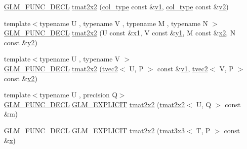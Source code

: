 \begin{DoxyCompactItemize}
\mbox{\hyperlink{setup_8hpp_ab2d052de21a70539923e9bcbf6e83a51}{G\+L\+M\+\_\+\+F\+U\+N\+C\+\_\+\+D\+E\+CL}} \mbox{\hyperlink{structglm_1_1tmat2x2_a6b69a58d1a8d7856f47240557f0c8615}{tmat2x2}} (\mbox{\hyperlink{structglm_1_1tmat2x2_a9e4690f52926b475b36ed5f6209f22f4}{col\+\_\+type}} const \&\mbox{\hyperlink{glad_8h_a0779c3b73f9aa3a0ac5b0139b5d291d9}{v1}}, \mbox{\hyperlink{structglm_1_1tmat2x2_a9e4690f52926b475b36ed5f6209f22f4}{col\+\_\+type}} const \&\mbox{\hyperlink{glad_8h_a9a09a1837922b2b806f4589096a52049}{v2}})
\item 
{\footnotesize template$<$typename U , typename V , typename M , typename N $>$ }\\\mbox{\hyperlink{setup_8hpp_ab2d052de21a70539923e9bcbf6e83a51}{G\+L\+M\+\_\+\+F\+U\+N\+C\+\_\+\+D\+E\+CL}} \mbox{\hyperlink{structglm_1_1tmat2x2_aac710faffcebf55cc2120a98b4ab0373}{tmat2x2}} (U const \&x1, V const \&\mbox{\hyperlink{glad_8h_a48340161068d267815ac3131e9d03def}{y1}}, M const \&\mbox{\hyperlink{glad_8h_ad2cea6eadb01f017f0d57e7edf0ce988}{x2}}, N const \&\mbox{\hyperlink{glad_8h_af7158b5d27f7a6aa4ab9973fcc3a5c20}{y2}})
\item 
{\footnotesize template$<$typename U , typename V $>$ }\\\mbox{\hyperlink{setup_8hpp_ab2d052de21a70539923e9bcbf6e83a51}{G\+L\+M\+\_\+\+F\+U\+N\+C\+\_\+\+D\+E\+CL}} \mbox{\hyperlink{structglm_1_1tmat2x2_ab910eb77d8f50dfa02ad062bb429e0a5}{tmat2x2}} (\mbox{\hyperlink{structglm_1_1tvec2}{tvec2}}$<$ U, P $>$ const \&\mbox{\hyperlink{glad_8h_a0779c3b73f9aa3a0ac5b0139b5d291d9}{v1}}, \mbox{\hyperlink{structglm_1_1tvec2}{tvec2}}$<$ V, P $>$ const \&\mbox{\hyperlink{glad_8h_a9a09a1837922b2b806f4589096a52049}{v2}})
\item 
{\footnotesize template$<$typename U , precision Q$>$ }\\\mbox{\hyperlink{setup_8hpp_ab2d052de21a70539923e9bcbf6e83a51}{G\+L\+M\+\_\+\+F\+U\+N\+C\+\_\+\+D\+E\+CL}} \mbox{\hyperlink{setup_8hpp_a6c74f5a5e7b134ab69023ff9a30d4d5d}{G\+L\+M\+\_\+\+E\+X\+P\+L\+I\+C\+IT}} \mbox{\hyperlink{structglm_1_1tmat2x2_add527359c118148fb8984d4868e0dc7f}{tmat2x2}} (\mbox{\hyperlink{structglm_1_1tmat2x2}{tmat2x2}}$<$ U, Q $>$ const \&m)
\item 
\mbox{\hyperlink{setup_8hpp_ab2d052de21a70539923e9bcbf6e83a51}{G\+L\+M\+\_\+\+F\+U\+N\+C\+\_\+\+D\+E\+CL}} \mbox{\hyperlink{setup_8hpp_a6c74f5a5e7b134ab69023ff9a30d4d5d}{G\+L\+M\+\_\+\+E\+X\+P\+L\+I\+C\+IT}} \mbox{\hyperlink{structglm_1_1tmat2x2_a21e814f61b4c8769f9e7ac36e531fc3a}{tmat2x2}} (\mbox{\hyperlink{structglm_1_1tmat3x3}{tmat3x3}}$<$ T, P $>$ const \&\mbox{\hyperlink{glad_8h_a92d0386e5c19fb81ea88c9f99644ab1d}{x}})

\end{DoxyCompactItemize}
